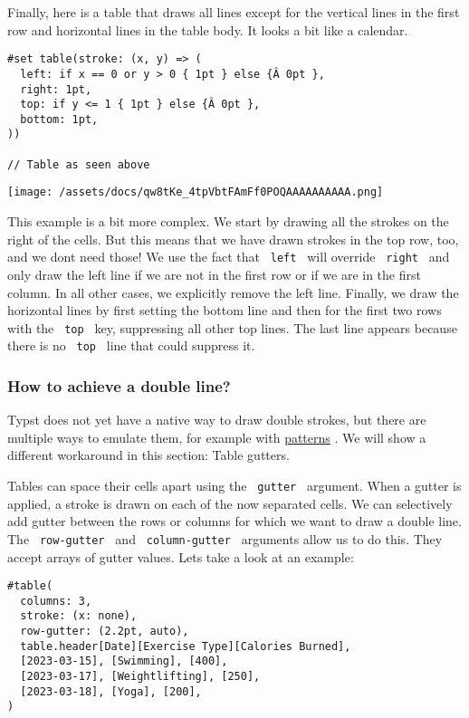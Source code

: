 Finally, here is a table that draws all lines except for the vertical
lines in the first row and horizontal lines in the table body. It looks
a bit like a calendar.

\begin{verbatim}
#set table(stroke: (x, y) => (
  left: if x == 0 or y > 0 { 1pt } else {Â 0pt },
  right: 1pt,
  top: if y <= 1 { 1pt } else {Â 0pt },
  bottom: 1pt,
))

// Table as seen above
\end{verbatim}

\texttt{[image: /assets/docs/qw8tKe\_4tpVbtFAmFf0POQAAAAAAAAAA.png]}

This example is a bit more complex. We start by drawing all the strokes
on the right of the cells. But this means that we have drawn strokes in
the top row, too, and we don\textquotesingle t need those! We use the
fact that \texttt{\ left\ } will override \texttt{\ right\ } and only
draw the left line if we are not in the first row or if we are in the
first column. In all other cases, we explicitly remove the left line.
Finally, we draw the horizontal lines by first setting the bottom line
and then for the first two rows with the \texttt{\ top\ } key,
suppressing all other top lines. The last line appears because there is
no \texttt{\ top\ } line that could suppress it.

\subsubsection{How to achieve a double line?}\label{double-stroke}

Typst does not yet have a native way to draw double strokes, but there
are multiple ways to emulate them, for example with
\href{/docs/reference/visualize/pattern/}{patterns} . We will show a
different workaround in this section: Table gutters.

Tables can space their cells apart using the \texttt{\ gutter\ }
argument. When a gutter is applied, a stroke is drawn on each of the now
separated cells. We can selectively add gutter between the rows or
columns for which we want to draw a double line. The
\texttt{\ row-gutter\ } and \texttt{\ column-gutter\ } arguments allow
us to do this. They accept arrays of gutter values.
Let\textquotesingle s take a look at an example:

\begin{verbatim}
#table(
  columns: 3,
  stroke: (x: none),
  row-gutter: (2.2pt, auto),
  table.header[Date][Exercise Type][Calories Burned],
  [2023-03-15], [Swimming], [400],
  [2023-03-17], [Weightlifting], [250],
  [2023-03-18], [Yoga], [200],
)
\end{verbatim}

